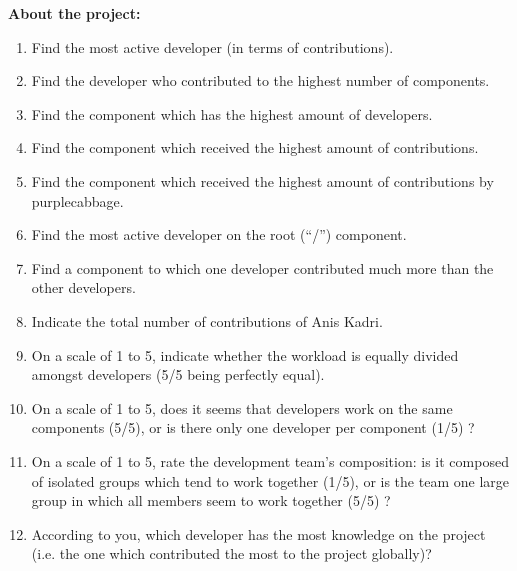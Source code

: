 \textbf{About the project:}
\begin{enumerate}
\item Find the most active developer (in terms of contributions).
\item Find the developer who contributed to the highest number of components.
\item Find the component which has the highest amount of developers.
\item Find the component which received the highest amount of contributions.
\item Find the component which received the highest amount of contributions by purplecabbage.
\item Find the most active developer on the root (“/”) component.
\item Find a component to which one developer contributed much more than the other developers.
\item Indicate the total number of contributions of Anis Kadri.
\item On a scale of 1 to 5, indicate whether the workload is equally divided amongst developers (5/5 being perfectly equal).
\item On a scale of 1 to 5, does it seems that developers work on the same components (5/5), or is there only one developer per component (1/5) ?
\item On a scale of 1 to 5, rate the development team’s composition: is it composed of isolated groups which tend to work together (1/5), or is the team one large group in which all members seem to work together (5/5) ?
\item According to you, which developer has the most knowledge on the project (i.e. the one which contributed the most to the project globally)?
\end{enumerate}